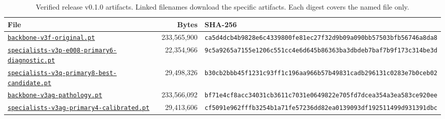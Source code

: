 \begin{table}[tbp]
\caption{Verified release v0.1.0 artifacts. Linked filenames download the specific artifacts. Each digest covers the named file only.\label{tab:app_hashes}}
\centering\small
\begin{tabular}{@{}p{.33\linewidth}rp{.45\linewidth}@{}}
\toprule
File & Bytes & SHA-256 \\
\midrule
\href{https://github.com/Mateo197802/titan-v45-ecg-multihead/releases/download/v0.1.0/backbone-v3f-original.pt}{\nolinkurl{backbone-v3f-original.pt}} & 233,565,900 & \texttt{ca5d4dcb4b9828e6c4339800fe81ec27}\newline\texttt{f32d9b09a090bb57503bfb56746a8da8} \\
\href{https://github.com/Mateo197802/titan-v45-ecg-multihead/releases/download/v0.1.0/specialists-v3p-e008-primary6-diagnostic.pt}{\nolinkurl{specialists-v3p-e008-primary6-diagnostic.pt}} & 22,354,966 & \texttt{9c5a9265a7155e1206c551cc4e6d645b}\newline\texttt{86363ba3dbdeb7baf7b9f173c314be3d} \\
\href{https://github.com/Mateo197802/titan-v45-ecg-multihead/releases/download/v0.1.0/specialists-v3q-primary8-best-candidate.pt}{\nolinkurl{specialists-v3q-primary8-best-candidate.pt}} & 29,498,326 & \texttt{b30cb2bbb45f1231c93ff1c196aa966b}\newline\texttt{57b49831cadb296131c0283e7b0ceb02} \\
\href{https://github.com/Mateo197802/titan-v45-ecg-multihead/releases/download/v0.1.0/backbone-v3ag-pathology.pt}{\nolinkurl{backbone-v3ag-pathology.pt}} & 233,566,092 & \texttt{bf71e4cf8acc34031cb3611c7031e064}\newline\texttt{9822e705fd7dcea354a3ea583ce920ee} \\
\href{https://github.com/Mateo197802/titan-v45-ecg-multihead/releases/download/v0.1.0/specialists-v3ag-primary4-calibrated.pt}{\nolinkurl{specialists-v3ag-primary4-calibrated.pt}} & 29,413,606 & \texttt{cf5091e962fffb3254b1a71fe57236dd}\newline\texttt{82ea0139093df192511499d931391dbc} \\
\bottomrule
\end{tabular}
\end{table}